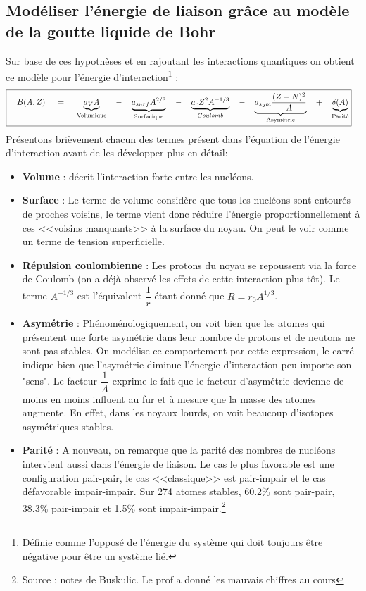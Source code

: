 \subsection{Modéliser l'énergie de liaison grâce au modèle de la goutte liquide de Bohr}



Sur base de ces hypothèses et en rajoutant les interactions quantiques on obtient ce modèle pour l'énergie d'interaction\footnote{Définie comme l'opposé de l'énergie du système qui doit toujours être négative pour être un système lié.} :
\begin{equation}
\boxed{
    \quad B(A,Z) \quad\; = \;\quad
    \underbrace{a_V A}_{\text{Volumique}}
    \quad -\quad
    \underbrace{a_{surf} A^{2/3}}_{\text{Surfacique}}
    \quad-\quad
    \underbrace{a_c Z^2 A^{-1/3 }}_{Coulomb}
    \quad-\quad 
    \underbrace{a_{sym}\dfrac{(Z-N)^2}{A}}_{\text{Asymétrie}}
    \quad+\quad 
    \underbrace{\delta(A)}_{\text{Parité}}}\quad
    \label{B}
\end{equation}
Présentons brièvement chacun des termes présent dans l'équation de l'énergie d'interaction avant de les développer plus en détail:
\begin{itemize}[label = $\bullet$]
    \item \textbf{Volume} : décrit l'interaction forte entre les nucléons.
    
    \item \textbf{Surface} : Le terme de volume considère que tous les nucléons sont entourés de proches voisins, le terme vient donc réduire l'énergie proportionnellement à ces <<voisins manquants>> à la surface du noyau. On peut le voir comme un terme de tension superficielle.
    
    \item \textbf{Répulsion coulombienne} : Les protons du noyau se repoussent via la force de Coulomb (on a déjà observé les effets de cette interaction plus tôt). Le terme $A^{-1/3}$ est l'équivalent $\dfrac{1}{r}$ étant donné que $R=r_0A^{1/3}$.
    
    \item \textbf{Asymétrie} : Phénoménologiquement, on voit bien que les atomes qui présentent une  forte asymétrie dans leur nombre de protons et de neutons ne sont pas stables. On modélise ce comportement par cette expression, le carré indique bien que l'asymétrie diminue l'énergie d'interaction peu importe son "sens". Le facteur $\dfrac{1}{A}$ exprime le fait que le facteur d'asymétrie devienne de moins en moins influent au fur et à mesure que la masse des atomes augmente. En effet, dans les noyaux lourds, on voit beaucoup d'isotopes asymétriques stables.
    
    \item \textbf{Parité} : A nouveau, on remarque que la parité des nombres de nucléons intervient aussi dans l'énergie de liaison. Le cas le plus favorable est une configuration pair-pair, le cas <<classique>> est pair-impair et le cas défavorable impair-impair. Sur 274 atomes stables, 60.2\% sont pair-pair, 38.3\% pair-impair et 1.5\% sont impair-impair.\footnote{Source : notes de Buskulic. Le prof a donné les mauvais chiffres au cours}
\end{itemize}

